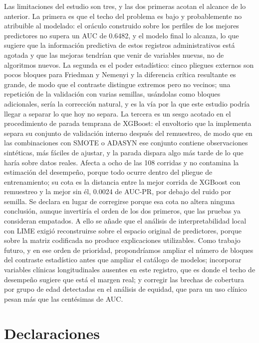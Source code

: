 \documentclass[pdflatex,sn-mathphys-num]{sn-jnl}
\begin{document}
Las limitaciones del estudio son tres, y las dos primeras acotan el alcance de lo anterior. La primera es que el techo del problema es bajo y probablemente no atribuible al modelado: el oráculo construido sobre los perfiles de los mejores predictores no supera un AUC de 0.6482, y el modelo final lo alcanza, lo que sugiere que la información predictiva de estos registros administrativos está agotada y que las mejoras tendrían que venir de variables nuevas, no de algoritmos nuevos. La segunda es el poder estadístico: cinco pliegues externos son pocos bloques para Friedman y Nemenyi y la diferencia crítica resultante es grande, de modo que el contraste distingue extremos pero no vecinos; una repetición de la validación con varias semillas, usándolas como bloques adicionales, sería la corrección natural, y es la vía por la que este estudio podría llegar a separar lo que hoy no separa. La tercera es un sesgo acotado en el procedimiento de parada temprana de XGBoost: el envoltorio que la implementa separa su conjunto de validación interno después del remuestreo, de modo que en las combinaciones con SMOTE o ADASYN ese conjunto contiene observaciones sintéticas, más fáciles de ajustar, y la parada dispara algo más tarde de lo que haría sobre datos reales. Afecta a ocho de las 108 corridas y no contamina la estimación del desempeño, porque todo ocurre dentro del pliegue de entrenamiento; su cota es la distancia entre la mejor corrida de XGBoost con remuestreo y la mejor sin él, 0.0024 de AUC-PR, por debajo del ruido por semilla. Se declara en lugar de corregirse porque esa cota no altera ninguna conclusión, aunque invertiría el orden de los dos primeros, que las pruebas ya consideran empatados. A ello se añade que el análisis de interpretabilidad local con LIME exigió reconstruirse sobre el espacio original de predictores, porque sobre la matriz codificada no produce explicaciones utilizables. Como trabajo futuro, y en ese orden de prioridad, propondríamos ampliar el número de bloques del contraste estadístico antes que ampliar el catálogo de modelos; incorporar variables clínicas longitudinales ausentes en este registro, que es donde el techo de desempeño sugiere que está el margen real; y corregir las brechas de cobertura por grupo de edad detectadas en el análisis de equidad, que para un uso clínico pesan más que las centésimas de AUC.

\backmatter

\section*{Declaraciones}
\end{document}

